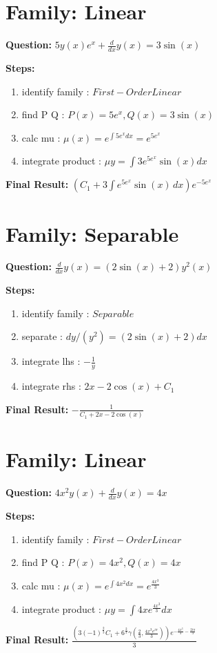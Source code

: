 \documentclass{article}
\begin{document}
\section*{Family: Linear}
\textbf{Question:} $5 y{\left(x \right)} e^{x} + \frac{d}{d x} y{\left(x \right)} = 3 \sin{\left(x \right)}$

\textbf{Steps:}
\begin{enumerate}
\item identify family :  $First-Order Linear$
\item find P Q :  $P(x)=5 e^{x}, Q(x)=3 \sin{\left(x \right)}$
\item calc mu :  $\mu(x) = e^{\int 5 e^{x} dx} = e^{5 e^{x}}$
\item integrate product :  $\mu y = \int 3 e^{5 e^{x}} \sin{\left(x \right)} dx$
\end{enumerate}
\textbf{Final Result:} $\left(C_{1} + 3 \int e^{5 e^{x}} \sin{\left(x \right)}\, dx\right) e^{- 5 e^{x}}$

\section*{Family: Separable}
\textbf{Question:} $\frac{d}{d x} y{\left(x \right)} = \left(2 \sin{\left(x \right)} + 2\right) y^{2}{\left(x \right)}$

\textbf{Steps:}
\begin{enumerate}
\item identify family :  $Separable$
\item separate :  $dy / (y^{2}) = (2 \sin{\left(x \right)} + 2) dx$
\item integrate lhs :  $- \frac{1}{y}$
\item integrate rhs :  $2 x - 2 \cos{\left(x \right)} + C_1$
\end{enumerate}
\textbf{Final Result:} $- \frac{1}{C_{1} + 2 x - 2 \cos{\left(x \right)}}$

\section*{Family: Linear}
\textbf{Question:} $4 x^{2} y{\left(x \right)} + \frac{d}{d x} y{\left(x \right)} = 4 x$

\textbf{Steps:}
\begin{enumerate}
\item identify family :  $First-Order Linear$
\item find P Q :  $P(x)=4 x^{2}, Q(x)=4 x$
\item calc mu :  $\mu(x) = e^{\int 4 x^{2} dx} = e^{\frac{4 x^{3}}{3}}$
\item integrate product :  $\mu y = \int 4 x e^{\frac{4 x^{3}}{3}} dx$
\end{enumerate}
\textbf{Final Result:} $\frac{\left(3 \left(-1\right)^{\frac{2}{3}} C_{1} + 6^{\frac{2}{3}} \gamma\left(\frac{2}{3}, \frac{4 x^{3} e^{i \pi}}{3}\right)\right) e^{- \frac{4 x^{3}}{3} - \frac{2 i \pi}{3}}}{3}$
\end{document}
